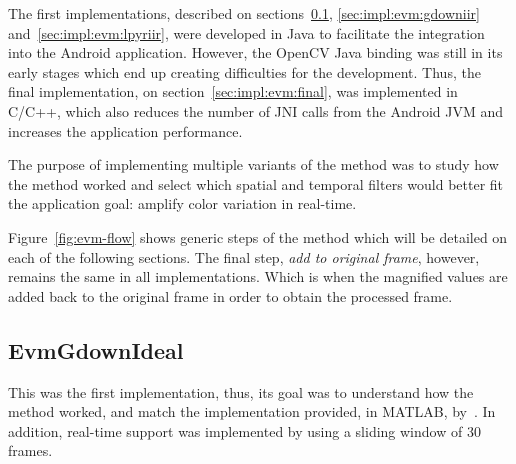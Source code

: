 The first implementations, described on sections~\ref{sec:impl:evm:gdownideal},
\ref{sec:impl:evm:gdowniir} and~\ref{sec:impl:evm:lpyriir},
were developed in Java to facilitate the integration into the Android
application. However, the OpenCV Java binding was still in its early stages
which end up creating difficulties for the development. Thus, the final
implementation, on section~\ref{sec:impl:evm:final}, was implemented in C/C++,
which also reduces the number of JNI calls from the Android JVM and
increases the application performance.

The purpose of implementing multiple variants of the method was to study
how the method worked and select which spatial and temporal filters would
better fit the application goal: amplify color variation in real-time.

Figure~\ref{fig:evm-flow} shows generic steps of the method which will be
detailed on each of the following sections. The final step,
\emph{add to original frame}, however, remains the same in all
implementations. Which is when the magnified values are added back to the
original frame in order to obtain the processed frame.

\subsection{EvmGdownIdeal} \label{sec:impl:evm:gdownideal}

This was the first implementation, thus, its goal was to understand how the
method worked, and match the implementation provided, in MATLAB,
by~\cite{Wu2012Eulerian}. In addition, real-time support was implemented
by using a sliding window of $30$ frames.

